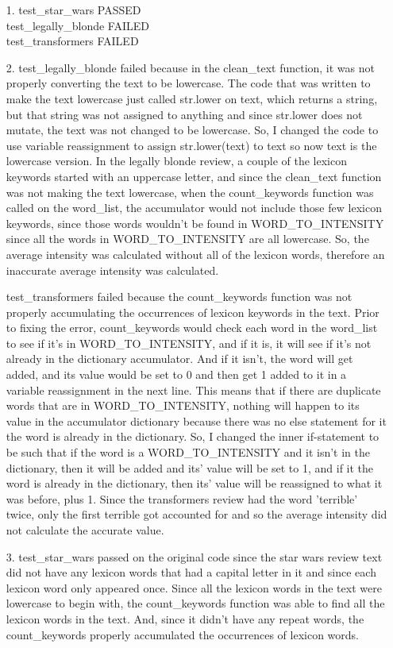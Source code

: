 \documentclass[11pt]{article}
\begin{document}
\begin{enumerate}
\item[1.]
test\_star\_wars PASSED \\
test\_legally\_blonde FAILED \\
test\_transformers FAILED

\item[2.]
test\_legally\_blonde failed because in the clean\_text function, it was not properly converting the text to be lowercase. The code that was written to make the text lowercase just called str.lower on text, which returns a string, but that string was not assigned to anything and since str.lower does not mutate, the text was not changed to be lowercase. So, I changed the code to use variable reassignment to assign str.lower(text) to text so now text is the lowercase version. In the legally blonde review, a couple of the lexicon keywords started with an uppercase letter, and since the clean\_text function was not making the text lowercase, when the count\_keywords function was called on the word\_list, the accumulator would not include those few lexicon keywords, since those words wouldn't be found in WORD\_TO\_INTENSITY since all the words in WORD\_TO\_INTENSITY are all lowercase. So, the average intensity was calculated without all of the lexicon words, therefore an inaccurate average intensity was calculated.

test\_transformers failed because the count\_keywords function was not properly accumulating the occurrences of lexicon keywords in the text. Prior to fixing the error, count\_keywords would check each word in the word\_list to see if it's in WORD\_TO\_INTENSITY, and if it is, it will see if it's not already in the dictionary accumulator. And if it isn't, the word will get added, and its value would be set to 0 and then get 1 added to it in a variable reassignment in the next line. This means that if there are duplicate words that are in WORD\_TO\_INTENSITY, nothing will happen to its value in the accumulator dictionary because there was no else statement for it the word is already in the dictionary. So, I changed the inner if-statement to be such that if the word is a WORD\_TO\_INTENSITY and it isn't in the dictionary, then it will be added and its' value will be set to 1, and if it the word is already in the dictionary, then its' value will be reassigned to what it was before, plus 1. Since the transformers review had the word 'terrible' twice, only the first terrible got accounted for and so the average intensity did not calculate the accurate value.

\item[3.]
test\_star\_wars passed on the original code since the star wars review text did not have any lexicon words that had a capital letter in it and since each lexicon word only appeared once. Since all the lexicon words in the text were lowercase to begin with, the count\_keywords function was able to find all the lexicon words in the text. And, since it didn't have any repeat words, the count\_keywords properly accumulated the occurrences of lexicon words.



\end{enumerate}
\end{document}
